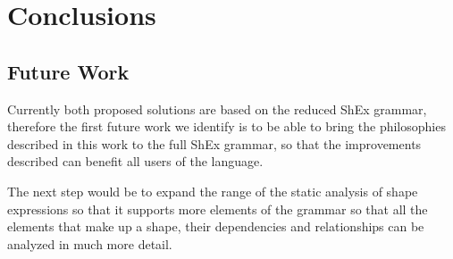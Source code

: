 \chapter{Conclusions}
\label{ch:conclusions}

\section{Future Work}
Currently both proposed solutions are based on the reduced ShEx grammar,
therefore the first future work we identify is to be able to bring the philosophies
described in this work to the full ShEx grammar, so that the improvements described
can benefit all users of the language.

The next step would be to expand the range of the static analysis of shape expressions
so that it supports more elements of the grammar so that all the elements that make
up a shape, their dependencies and relationships can be analyzed in much more detail.